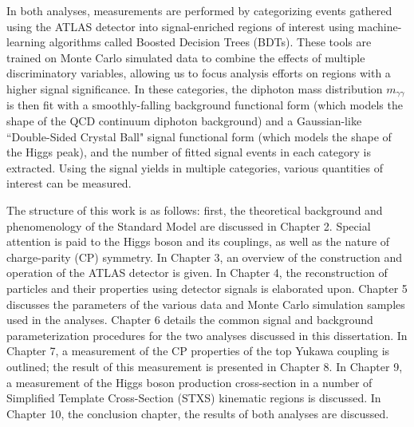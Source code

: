 In both analyses, measurements are performed by categorizing events gathered using the ATLAS detector into signal-enriched regions of interest using machine-learning algorithms called Boosted Decision Trees (BDTs). These tools are trained on Monte Carlo simulated data to combine the effects of multiple discriminatory variables, allowing us to focus analysis efforts on regions with a higher signal significance. In these categories, the diphoton mass distribution $m_{\gamma \gamma}$ is then fit with a smoothly-falling background functional form (which models the shape of the QCD continuum diphoton background) and a Gaussian-like ``Double-Sided Crystal Ball" signal functional form (which models the shape of the Higgs peak), and the number of fitted signal events in each category is extracted. Using the signal yields in multiple categories, various quantities of interest can be measured.

The structure of this work is as follows: first, the theoretical background and phenomenology of the Standard Model are discussed in Chapter 2. Special attention is paid to the Higgs boson and its couplings, as well as the nature of charge-parity (CP) symmetry. In Chapter 3, an overview of the construction and operation of the ATLAS detector is given. In Chapter 4, the reconstruction of particles and their properties using detector signals is elaborated upon. Chapter 5 discusses the parameters of the various data and Monte Carlo simulation samples used in the analyses. Chapter 6 details the common signal and background parameterization procedures for the two analyses discussed in this dissertation. In Chapter 7, a measurement of the CP properties of the top Yukawa coupling is outlined; the result of this measurement is presented in Chapter 8. In Chapter 9, a measurement of the Higgs boson production cross-section in a number of Simplified Template Cross-Section (STXS) kinematic regions is discussed. In Chapter 10, the conclusion chapter, the results of both analyses are discussed.

